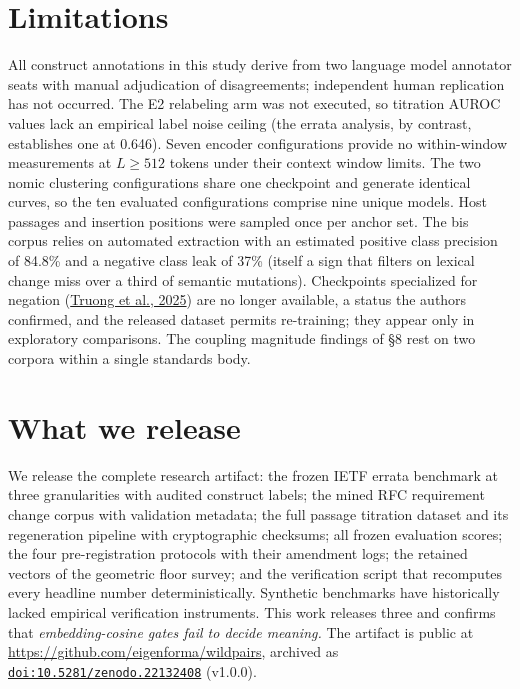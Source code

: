 \documentclass[11pt]{article}
\newcommand{\doilink}[1]{\href{https://doi.org/#1}{\nolinkurl{doi:#1}}}
\begin{document}
\section{Limitations}

All construct annotations in this study derive from two language model annotator seats with manual adjudication of disagreements; independent human replication has not occurred. The E2 relabeling arm was not executed, so titration AUROC values lack an empirical label noise ceiling (the errata analysis, by contrast, establishes one at 0.646). Seven encoder configurations provide no within-window measurements at $L \ge 512$ tokens under their context window limits. The two nomic clustering configurations share one checkpoint and generate identical curves, so the ten evaluated configurations comprise nine unique models. Host passages and insertion positions were sampled once per anchor set. The bis corpus relies on automated extraction with an estimated positive class precision of 84.8\% and a negative class leak of 37\% (itself a sign that filters on lexical change miss over a third of semantic mutations). Checkpoints specialized for negation (\hyperlink{bib:truong}{Truong et al., 2025}) are no longer available, a status the authors confirmed, and the released dataset permits re-training; they appear only in exploratory comparisons. The coupling magnitude findings of \S8 rest on two corpora within a single standards body.

\section{What we release}

We release the complete research artifact: the frozen IETF errata benchmark at three granularities with audited construct labels; the mined RFC requirement change corpus with validation metadata; the full passage titration dataset and its regeneration pipeline with cryptographic checksums; all frozen evaluation scores; the four pre-registration protocols with their amendment logs; the retained vectors of the geometric floor survey; and the verification script that recomputes every headline number deterministically. Synthetic benchmarks have historically lacked empirical verification instruments. This work releases three and confirms that \emph{embedding-cosine gates fail to decide meaning.} The artifact is public at \url{https://github.com/eigenforma/wildpairs}, archived as \doilink{10.5281/zenodo.22132408} (v1.0.0).
\end{document}
